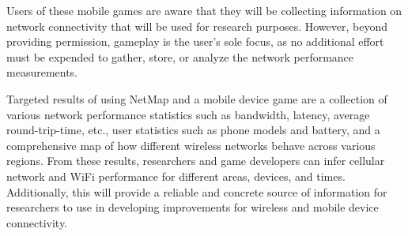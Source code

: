 Users of these mobile games are aware that they will be collecting information on network connectivity that will be used for research purposes. However, beyond providing permission, gameplay is the user’s sole focus, as no additional effort must be expended to gather, store, or analyze the network performance measurements.

Targeted results of using NetMap and a mobile device game are a collection of various network performance statistics such as bandwidth, latency, average round-trip-time, etc., user statistics such as phone models and battery, and a comprehensive map of how different wireless networks behave across various regions. From these results, researchers and game developers can infer cellular network and WiFi performance for different areas, devices, and times. Additionally, this will provide a reliable and concrete source of information for researchers to use in developing improvements for wireless and mobile device connectivity. 

